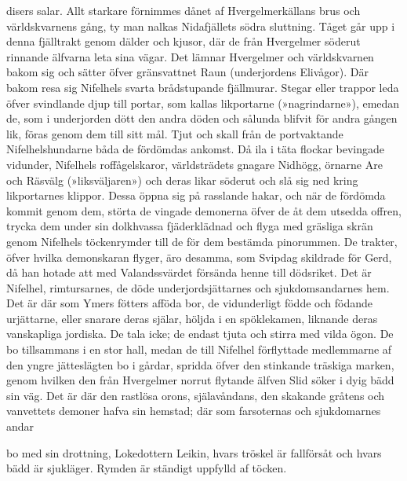 disers salar. Allt starkare förnimmes dånet af Hvergelmerkällans brus
och världskvarnens gång, ty man nalkas Nidafjällets södra sluttning.
Tåget går upp i denna fjälltrakt genom dälder och kjusor, där de från
Hvergelmer söderut rinnande älfvarna leta sina vägar. Det lämnar
Hvergelmer och världskvarnen bakom sig och sätter öfver gränsvattnet
Raun (underjordens Elivågor). Där bakom resa sig Nifelhels svarta
brådstupande fjällmurar. Stegar eller trappor leda öfver svindlande djup
till portar, som kallas likportarne (»nagrindarne»), emedan de, som i
underjorden dött den andra döden och sålunda blifvit för andra gången
lik, föras genom dem till sitt mål. Tjut och skall från de portvaktande
Nifelhelshundarne båda de fördömdas ankomst. Då ila i täta flockar
bevingade vidunder, Nifelhels roffågelskaror, världsträdets gnagare
Nidhögg, örnarne Are och Räsvälg (»liksväljaren») och deras likar
söderut och slå sig ned kring likportarnes klippor. Dessa öppna sig på
rasslande hakar, och när de fördömda kommit genom dem, störta de vingade
demonerna öfver de åt dem utsedda offren, trycka dem under sin
dolkhvassa fjäderklädnad och flyga med gräsliga skrän genom Nifelhels
töckenrymder till de för dem bestämda pinorummen. De trakter, öfver
hvilka demonskaran flyger, äro desamma, som Svipdag skildrade för Gerd,
då han hotade att med Valandssvärdet försända henne till dödsriket. Det
är Nifelhel, rimtursarnes, de döde underjordsjättarnes och
sjukdomsandarnes hem. Det är där som Ymers fötters afföda bor, de
vidunderligt födde och födande urjättarne, eller snarare deras själar,
höljda i en spöklekamen, liknande deras vanskapliga jordiska. De tala
icke; de endast tjuta och stirra med vilda ögon. De bo tillsammans i en
stor hall, medan de till Nifelhel förflyttade medlemmarne af den yngre
jätteslägten bo i gårdar, spridda öfver den stinkande träskiga marken,
genom hvilken den från Hvergelmer norrut flytande älfven Slid söker i
dyig bädd sin väg. Det är där den rastlösa orons, själavåndans, den
skakande gråtens och vanvettets demoner hafva sin hemstad; där som
farsoternas och sjukdomarnes andar

bo med sin drottning, Lokedottern Leikin, hvars tröskel är fallförsåt
och hvars bädd är sjukläger. Rymden är ständigt uppfylld af töcken.

